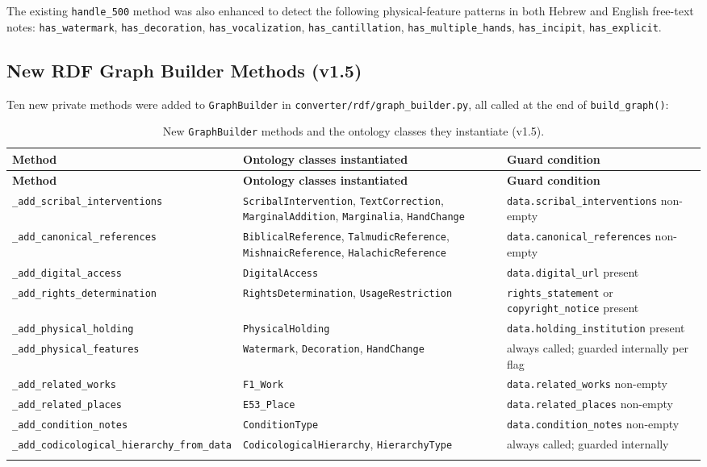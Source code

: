 \documentclass[12pt]{article}
\newcommand{\filepath}[1]{\texttt{\small #1}}
\newcommand{\code}[1]{\texttt{#1}}
\begin{document}
\noindent The existing \code{handle\_500} method was also enhanced to detect the following physical-feature patterns in both Hebrew and English free-text notes: \code{has\_watermark}, \code{has\_decoration}, \code{has\_vocalization}, \code{has\_cantillation}, \code{has\_multiple\_hands}, \code{has\_incipit}, \code{has\_explicit}.

\subsection{New RDF Graph Builder Methods (v1.5)}

Ten new private methods were added to \code{GraphBuilder} in \filepath{converter/rdf/graph\_builder.py}, all called at the end of \code{build\_graph()}:

\begin{longtable}{|l|p{4.5cm}|p{4.5cm}|}
\hline
\textbf{Method} & \textbf{Ontology classes instantiated} & \textbf{Guard condition} \\
\hline
\endfirsthead
\hline
\textbf{Method} & \textbf{Ontology classes instantiated} & \textbf{Guard condition} \\
\hline
\endhead
\hline
\endfoot
\code{\_add\_scribal\_interventions} & \code{ScribalIntervention}, \code{TextCorrection}, \code{MarginalAddition}, \code{Marginalia}, \code{HandChange} & \code{data.scribal\_interventions} non-empty \\
\hline
\code{\_add\_canonical\_references} & \code{BiblicalReference}, \code{TalmudicReference}, \code{MishnaicReference}, \code{HalachicReference} & \code{data.canonical\_references} non-empty \\
\hline
\code{\_add\_digital\_access} & \code{DigitalAccess} & \code{data.digital\_url} present \\
\hline
\code{\_add\_rights\_determination} & \code{RightsDetermination}, \code{UsageRestriction} & \code{rights\_statement} or \code{copyright\_notice} present \\
\hline
\code{\_add\_physical\_holding} & \code{PhysicalHolding} & \code{data.holding\_institution} present \\
\hline
\code{\_add\_physical\_features} & \code{Watermark}, \code{Decoration}, \code{HandChange} & always called; guarded internally per flag \\
\hline
\code{\_add\_related\_works} & \code{F1\_Work} & \code{data.related\_works} non-empty \\
\hline
\code{\_add\_related\_places} & \code{E53\_Place} & \code{data.related\_places} non-empty \\
\hline
\code{\_add\_condition\_notes} & \code{ConditionType} & \code{data.condition\_notes} non-empty \\
\hline
\code{\_add\_codicological\_hierarchy\_from\_data} & \code{CodicologicalHierarchy}, \code{HierarchyType} & always called; guarded internally \\
\hline
\caption{New \code{GraphBuilder} methods and the ontology classes they instantiate (v1.5).}
\label{tbl:v15-methods}
\end{longtable}
\end{document}
